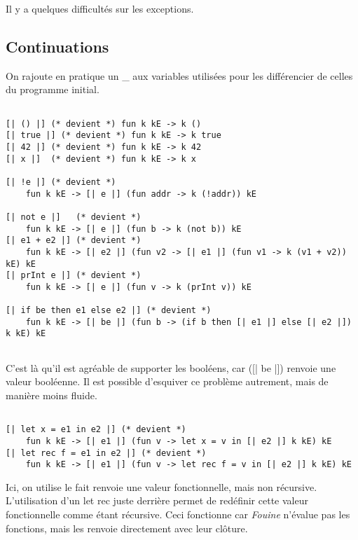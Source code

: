 \documentclass{article}
\newcommand\code[1]{{\fontfamily{lmtt}\selectfont #1}}
\begin{document}
	Il y a quelques difficultés sur les exceptions.
	

\subsection{Continuations}

	On rajoute en pratique un \code{\_} aux variables utilisées pour les différencier de celles du programme initial.

	\begin{verbatim}

[| () |] (* devient *) fun k kE -> k ()
[| true |] (* devient *) fun k kE -> k true
[| 42 |] (* devient *) fun k kE -> k 42
[| x |]  (* devient *) fun k kE -> k x

[| !e |] (* devient *) 
	fun k kE -> [| e |] (fun addr -> k (!addr)) kE

[| not e |]   (* devient *) 
	fun k kE -> [| e |] (fun b -> k (not b)) kE
[| e1 + e2 |] (* devient *) 
	fun k kE -> [| e2 |] (fun v2 -> [| e1 |] (fun v1 -> k (v1 + v2)) kE) kE
[| prInt e |] (* devient *) 
	fun k kE -> [| e |] (fun v -> k (prInt v)) kE

[| if be then e1 else e2 |] (* devient *) 
	fun k kE -> [| be |] (fun b -> (if b then [| e1 |] else [| e2 |]) k kE) kE
	
	\end{verbatim}
	
	C'est là qu'il est agréable de supporter les booléens, car \code([| be |]) renvoie une valeur booléenne. Il est possible d'esquiver ce problème autrement, mais de manière moins fluide.
	
	\begin{verbatim}
	
[| let x = e1 in e2 |] (* devient *) 
	fun k kE -> [| e1 |] (fun v -> let x = v in [| e2 |] k kE) kE 
[| let rec f = e1 in e2 |] (* devient *) 
	fun k kE -> [| e1 |] (fun v -> let rec f = v in [| e2 |] k kE) kE

	\end{verbatim}
	
	Ici, on utilise le fait \code{[| e1 |]} renvoie une valeur fonctionnelle, mais non récursive. L'utilisation d'un \code{let rec} juste derrière permet de redéfinir cette valeur fonctionnelle comme étant récursive. Ceci fonctionne car \emph{Fouine} n'évalue pas les fonctions, mais les renvoie directement avec leur clôture.
	
\end{document}
